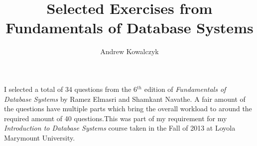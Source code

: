 \documentclass[12pt, oneside]{article}
\title{Selected Exercises from Fundamentals of Database Systems}
\author{Andrew Kowalczyk}
\date{}
\begin{document}
\maketitle
I selected a total of 34 questions from the 6$^{th}$ edition of \textit{Fundamentals of Database Systems} by Ramez Elmasri and Shamkant Navathe. A fair amount of the questions have multiple parts which bring the overall workload to around the required amount of 40 questions.This was part of my requirement for my \textit{Introduction to Database Systems} course taken in the Fall of 2013 at Loyola Marymount University.

\pagebreak
\tableofcontents
\pagebreak


\pagebreak

\pagebreak

\pagebreak

\pagebreak

\pagebreak

\pagebreak

\pagebreak

\pagebreak

\pagebreak

\pagebreak

\pagebreak

\pagebreak

\pagebreak

\pagebreak

\pagebreak

\pagebreak

\pagebreak

\end{document}
